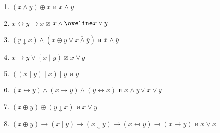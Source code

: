     \begin{minipage}[t]{0.8\textwidth}
        \begin{enumerate}
            \item $(x \wedge y) \oplus x$ и $x\wedge \overline y$
            \item $x \leftrightarrow y \rightarrow x$ и $x \wedge \oveline x \vee y$
            \item $(y \downarrow x) \wedge (x \oplus y \vee \overline{x \wedge \overline y})$ и $\overline x \wedge \overline y$
            \item $\overline{x \rightarrow y} \vee (x \mid y)$ и $\overline x \vee \overline y$
            \item $((x \mid y) \mid x) \mid y$ и $\overline y$
            \item $(x \leftrightarrow y) \wedge (x \rightarrow y) \wedge (y \leftrightarrow x)$ и $x \wedge y \vee \overline x \vee \overline y$
            \item $(x \oplus y) \oplus (y \downarrow x)$ и $\overline x \vee \overline y$
            \item $(x \oplus y) \rightarrow (x \mid y) \rightarrow (x \downarrow y) \rightarrow (x \leftrightarrow y) \rightarrow (x \rightarrow y)$ и $x \vee \overline x$
        \end{enumerate}
    \end{minipage}


